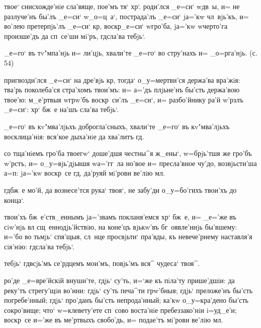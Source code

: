  твое` снисхожде'нiе сла'вяще, пое'мъ тя` 
хр`. роди'лся _е=си` w\т дв~ы, и= не разлуче'нъ бы'лъ 
_е=си` w\т _о=ц~а`, пострада'лъ _е=си` jа='кw чл~вjь'къ, 
и= во'лею претерпjь'лъ _е=си` кр, воскр _е=си` 
w\т гро'ба, jа='кw w\т черто'га произше'дъ да сп~се'ши 
мi'ръ, гд сла'ва тебjь`.


  _е=го` въ тv"мпа'нjь и= ли'цjь, 
хвали'те _е=го` во стру'нахъ и= _о=рга'нjь. (с. 54)

 пригвозди'лся _е=си` на дре'вjь кр, 
тогда` о_у=мертви'ся держа'ва вра'жiя: тва'рь поколеба'ся 
стра'хомъ твои'мъ: и= а='дъ плjьне'нъ бы'сть держа'вою 
твое'ю: м_е'ртвыя w\т грw'бъ воскр~си'лъ _е=си`, и= 
разбо'йнику ра'й w'рзлъ _е=си`: хр` бж~е на'шъ 
сла'ва тебjь`.

  _е=го` въ кv"мва'лjьхъ 
доброгла'сныхъ, хвали'те _е=го` въ кv"мва'лjьхъ 
восклица'нiя: вся'кое дыха'нiе да хва'литъ гд.

 со тща'нiемъ гро'ба твоегw` доше'дшя 
честны^я ж_ены`, w=брjь'тшя же гро'бъ w'рстъ, и= 
о_у=вjь'дjьвшя w\т а='гг~ла но'вое и= пресла'вное чу'до, 
возвjьсти'ша а=п: jа='кw воскр~се гд, да'руяй 
мi'рови ве'лiю мл.

  гд бж~е мо'й, да вознесе'тся 
рука` твоя`, не забу'ди о_у=бо'гихъ твои'хъ до конца`.

 твои'хъ бж~е'ств_еннымъ jа='звамъ 
покланя'емся хр` бж~е, и= _е='же въ сiw'нjь вл 
сщ~еннодjь'йствiю, на коне'цъ вjькw'въ бг~оявле'ннjь 
бы'вшему: и='бо во тьмjь` спя'щыя, сл~нце просвjьти` 
пра'вды, къ невече'рнему наставля'я сiя'нiю: гд сла'ва 
тебjь`.

  тебjь` гд всjь'мъ се'рдцемъ 
мои'мъ, повjь'мъ вся^ чудеса` твоя^.

 ро'де _е=вре'йскiй внуши'те, гдjь` 
су'ть, и=`же къ пiла'ту прише'дшiи: да реку'тъ стрегу'щiи 
во'ини: гдjь` су'ть печа^ти грw'бныя; гдjь` преложе'нъ 
бы'сть погребе'нный; гдjь` про'данъ бы'сть непрода'нный; 
ка'кw о_у=кра'дено бы'сть сокро'вище; что` w=клевету'ете 
сп~сово воста'нiе пребеззако'нiи i=уд_е'и; воскр~се и='же 
въ ме'ртвыхъ свобо'дь, и= подае'тъ мi'рови ве'лiю мл.

